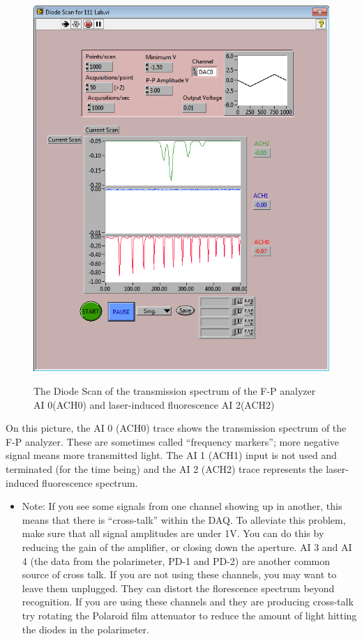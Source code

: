 \documentclass{../lab}
\begin{document}
\begin{figure}[h]
    \centering
    \href{http://experimentationlab.berkeley.edu/sites/default/files/images/Rb_doppler_spect.png}{\includegraphics[width=0.5\linewidth]{images/Rb_doppler_spect.png}}
    \caption{The Diode Scan of the transmission spectrum of the F-P analyzer AI 0(ACH0) and laser-induced fluorescence AI 2(ACH2)}
    \label{fig:DiodeScanOfTransmissionSpectrum}
\end{figure}

On this picture, the AI 0 (ACH0) trace shows the transmission spectrum of the F-P analyzer. These are sometimes called ``frequency markers''; more negative signal means more transmitted light. The AI 1 (ACH1) input is not used and terminated (for the time being) and the AI 2 (ACH2) trace represents the laser-induced fluorescence spectrum.

\begin{itemize}
    \item Note: If you see some signals from one channel showing up in another, this means that there is ``cross-talk'' within the DAQ. To alleviate this problem, make sure that all signal amplitudes are under 1V. You can do this by reducing the gain of the amplifier, or closing down the aperture. AI 3 and AI 4 (the data from the polarimeter, PD-1 and PD-2) are another common source of cross talk. If you are not using these channels, you may want to leave them unplugged. They can distort the florescence spectrum beyond recognition. If you are using these channels and they are producing cross-talk try rotating the Polaroid film attenuator to reduce the amount of light hitting the diodes in the polarimeter.

\end{itemize}
\end{document}
